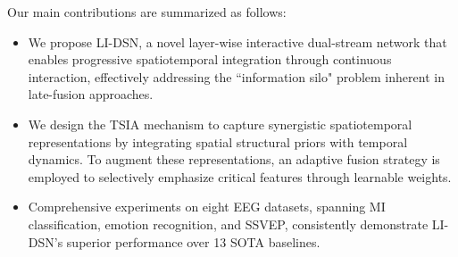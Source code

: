 \documentclass[journal]{IEEEtran}
\theoremstyle{plain}
\begin{document}
Our main contributions are summarized as follows:
\begin{itemize}
    \item We propose LI-DSN, a novel layer-wise interactive dual-stream network that enables progressive spatiotemporal integration through continuous interaction, effectively addressing the “information silo" problem inherent in late-fusion approaches.

    \item We design the TSIA mechanism to capture synergistic spatiotemporal representations by integrating spatial structural priors with temporal dynamics. To augment these representations, an adaptive fusion strategy is employed to selectively emphasize critical features through learnable weights.
    
    \item Comprehensive experiments on eight EEG datasets, spanning MI classification, emotion recognition, and SSVEP, consistently demonstrate LI-DSN's superior performance over 13 SOTA baselines.
\end{itemize}
\end{document}
